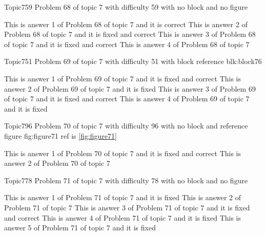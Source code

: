 \documentclass[master]{exam}
\begin{document}
\begin{problem}{Topic7}{59}
	Problem 68 of topic 7 with difficulty 59 with no block and no figure
	\begin{answers}
		\answer[correct] This is answer 1 of Problem 68 of topic 7 and it is correct
		 This is answer 2 of Problem 68 of topic 7 and it is fixed and correct
		 This is answer 3 of Problem 68 of topic 7 and it is fixed and correct
		\answer This is answer 4 of Problem 68 of topic 7 
	\end{answers}
\end{problem}

\begin{problem}[requires=blk:block76]{Topic7}{51}
	Problem 69 of topic 7 with difficulty 51 with block reference blk:block76
	\begin{answers}
		 This is answer 1 of Problem 69 of topic 7 and it is fixed and correct
		\answer[fixed] This is answer 2 of Problem 69 of topic 7 and it is fixed
		 This is answer 3 of Problem 69 of topic 7 and it is fixed and correct
		\answer[fixed] This is answer 4 of Problem 69 of topic 7 and it is fixed
	\end{answers}
\end{problem}

\begin{problem}{Topic7}{96}
	Problem 70 of topic 7 with difficulty 96 with no block and reference figure fig:figure71 ref is \ref{fig:figure71}
	\begin{answers}
		 This is answer 1 of Problem 70 of topic 7 and it is fixed and correct
		\answer This is answer 2 of Problem 70 of topic 7 
	\end{answers}
\end{problem}

\begin{problem}{Topic7}{78}
	Problem 71 of topic 7 with difficulty 78 with no block and no figure
	\begin{answers}
		\answer[fixed] This is answer 1 of Problem 71 of topic 7 and it is fixed
		\answer This is answer 2 of Problem 71 of topic 7 
		 This is answer 3 of Problem 71 of topic 7 and it is fixed and correct
		\answer[fixed] This is answer 4 of Problem 71 of topic 7 and it is fixed
		\answer[fixed] This is answer 5 of Problem 71 of topic 7 and it is fixed
	\end{answers}
\end{problem}
\end{document}
